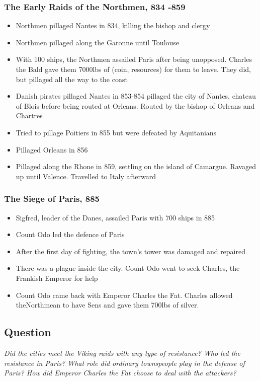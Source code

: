 \documentclass[12pt]{article}
\begin{document}
{\subsubsection*{The Early Raids of the Northmen, 834 -859}
\begin{itemize}
	\item Northmen pillaged Nantes in 834, killing the bishop and clergy
	\item Northmen pillaged along the Garonne until Toulouse
	\item With 100 ships, the Northmen assailed Paris after being unopposed. Charles the Bald gave them 7000lbs of (coin, resources) for them to leave. They did, but pillaged all the way to the coast
	\item Danish pirates pillaged Nantes in 853-854 pillaged the city of Nantes, chateau of Blois before being routed at Orleans. Routed by the bishop of Orleans and Chartres
	\item Tried to pillage Poitiers in 855 but were defeated by Aquitanians
	\item Pillaged Orleans in 856
	\item Pillaged along the Rhone in 859, settling on the island of Camargue. Ravaged up until Valence. Travelled to Italy afterward
\end{itemize}

\subsubsection*{The Siege of Paris, 885}
\begin{itemize}
	\item Sigfred, leader of the Danes, assailed Paris with 700 ships in 885
	\item Count Odo led the defence of Paris
	\item After the first day of fighting, the town's tower was damaged and repaired
	\item There was a plague inside the city. Count Odo went to seek Charles, the Frankish Emperor for help
	\item Count Odo came back with Emperor Charles the Fat. Charles allowed theNorthmean to have Sens and gave them 700lbs of silver.
\end{itemize}
	
\subsection*{Question}

\begin{center}
	\textit{Did the cities meet the Viking raids with any type of resistance? Who led the resistance in Paris? What role did ordinary townspeople play in the defense of Paris? How did Emperor Charles the Fat choose to deal with the attackers?}
\end{center}

}
\end{document}
